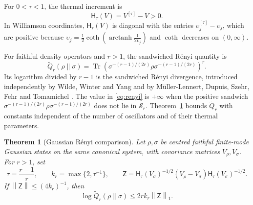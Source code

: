 \documentclass[11pt]{amsart}
\numberwithin{equation}{section}
\newtheorem{theorem}{Theorem}[section]
\theoremstyle{definition}
\newcommand{\Sc}{\mathcal S}
\newcommand{\Therm}{\mathsf H}
\newcommand{\Qtil}{\widetilde Q}
\newcommand{\Tr}{\operatorname{Tr}}
\newcommand{\arctanh}{\operatorname{arctanh}}
\newcommand{\norm}[1]{\left\|#1\right\|}
\begin{document}
For \(0<\tau<1\), the thermal increment is
\[
 \Therm_\tau(V)=V^{[\tau]}-V>0.
\]
In Williamson coordinates, \(\Therm_\tau(V)\) is diagonal with the
entries \(\upsilon_j^{[\tau]}-\upsilon_j\), which are positive because
\(\upsilon_j=\frac12\coth(\arctanh\frac1{2\upsilon_j})\) and \(\coth\)
decreases on \((0,\infty)\).

For faithful density operators and \(r>1\), the sandwiched Rényi
quantity is
\begin{equation}
 \Qtil_r(\rho\|\sigma)
 =\Tr\left(
 \sigma^{-(r-1)/(2r)}\rho
 \sigma^{-(r-1)/(2r)}\right)^r.
 \label{eq:renyi}
\end{equation}
Its logarithm divided by \(r-1\) is the sandwiched Rényi divergence,
introduced independently by Wilde, Winter and Yang \cite{WWY14} and by
Müller-Lennert, Dupuis, Szehr, Fehr and Tomamichel \cite{ML13}. The value in \eqref{eq:renyi} is \(+\infty\) when
the positive sandwich \(\sigma^{-(r-1)/(2r)}\rho\sigma^{-(r-1)/(2r)}\)
does not lie in \(\Sc_r\).
Theorem~\ref{thm:gaussian} bounds \(\Qtil_r\) with constants independent of
the number of oscillators and of their thermal parameters.

\begin{theorem}[Gaussian Rényi comparison]\label{thm:gaussian}
Let \(\rho,\sigma\) be centred faithful finite-mode Gaussian states
on the same canonical system, with covariance matrices
\(V_\rho,V_\sigma\). For \(r>1\), set
\[
 \tau=\frac{r-1}{r},\qquad k_r=\max\{2,\tau^{-1}\},\qquad
 \mathsf Z=
 \Therm_\tau(V_\sigma)^{-1/2}(V_\rho-V_\sigma)
 \Therm_\tau(V_\sigma)^{-1/2}.
\]
If \(\norm{\mathsf Z}\le(4k_r)^{-1}\), then
\begin{equation}
 \log\Qtil_r(\rho\|\sigma)\le2rk_r\norm{\mathsf Z}_1.
 \label{eq:gaussian-bound}
\end{equation}
\end{theorem}
\end{document}
